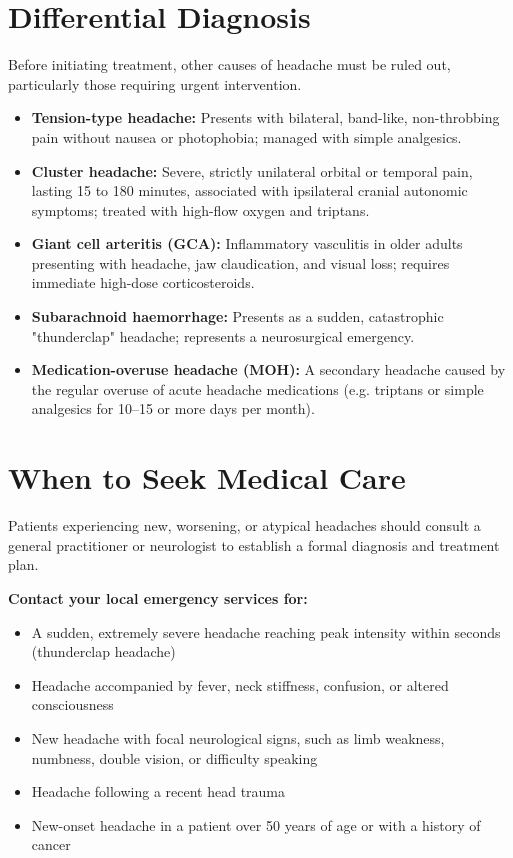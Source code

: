 \section*{Differential Diagnosis}
Before initiating treatment, other causes of headache must be ruled out, particularly those requiring urgent intervention.
\begin{itemize}
    \item \textbf{Tension-type headache:} Presents with bilateral, band-like, non-throbbing pain without nausea or photophobia; managed with simple analgesics.
    \item \textbf{Cluster headache:} Severe, strictly unilateral orbital or temporal pain, lasting 15 to 180 minutes, associated with ipsilateral cranial autonomic symptoms; treated with high-flow oxygen and triptans.
    \item \textbf{Giant cell arteritis (GCA):} Inflammatory vasculitis in older adults presenting with headache, jaw claudication, and visual loss; requires immediate high-dose corticosteroids.
    \item \textbf{Subarachnoid haemorrhage:} Presents as a sudden, catastrophic "thunderclap" headache; represents a neurosurgical emergency.
    \item \textbf{Medication-overuse headache (MOH):} A secondary headache caused by the regular overuse of acute headache medications (e.g. triptans or simple analgesics for 10--15 or more days per month).
\end{itemize}

\section*{When to Seek Medical Care}
Patients experiencing new, worsening, or atypical headaches should consult a general practitioner or neurologist to establish a formal diagnosis and treatment plan.

\textbf{Contact your local emergency services for:}
\begin{itemize}
    \item A sudden, extremely severe headache reaching peak intensity within seconds (thunderclap headache)
    \item Headache accompanied by fever, neck stiffness, confusion, or altered consciousness
    \item New headache with focal neurological signs, such as limb weakness, numbness, double vision, or difficulty speaking
    \item Headache following a recent head trauma
    \item New-onset headache in a patient over 50 years of age or with a history of cancer
\end{itemize}

